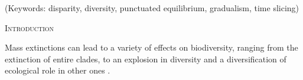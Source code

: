 \documentclass[12pt,letterpaper]{article}
\renewcommand{\section}[1]{%
\bigskip
\begin{center}
\begin{Large}
\normalfont\scshape #1
\medskip
\end{Large}
\end{center}}
\begin{document}
\noindent (Keywords: disparity, diversity, punctuated equilibrium, gradualism, time slicing)\\

\vspace{1.5in}

\newpage 

%
%

\section{Introduction}





Mass extinctions can lead to a variety of effects on biodiversity, ranging from the extinction of entire clades,  to an explosion in diversity and a diversification of ecological role in other ones \citep{Erwin1998344}. 
\end{document}
